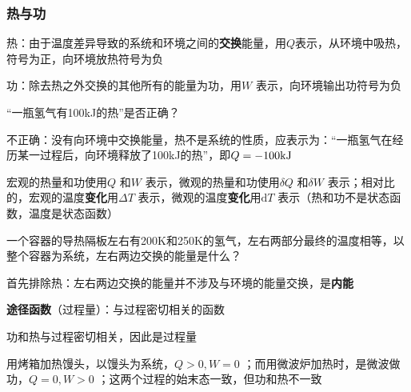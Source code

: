 \subsubsection*{热与功}%
\label{subsub:热与功}
\begin{defi}
热：由于温度差异导致的系统和环境之间的\textbf{交换}能量，用$Q$表示，从环境中吸热，符号为正，向环境放热符号为负

功：除去热之外交换的其他所有的能量为功，用$W$ 表示，向环境输出功符号为负
\end{defi}
\begin{question}
    “一瓶氢气有100kJ的热”是否正确？
\end{question}
\begin{sol}
    不正确：没有向环境中交换能量，热不是系统的性质，应表示为：“一瓶氢气在经历某一过程后，向环境释放了100kJ的热”，即$Q=-100\ce{kJ}$
\end{sol}
宏观的热量和功使用$Q$ 和$W$ 表示，微观的热量和功使用$\delta Q$ 和$\delta W$ 表示；相对比的，宏观的温度\textbf{变化}用$\Delta T$ 表示，微观的温度\textbf{变化}用$\mathrm{d}T$ 表示（热和功不是状态函数，温度是状态函数）
\begin{question}
    一个容器的导热隔板左右有200K和250K的氢气，左右两部分最终的温度相等，以整个容器为系统，左右两边交换的能量是什么？
\end{question}
\begin{sol}
    首先排除热：左右两边交换的能量并不涉及与环境的能量交换，是\textbf{内能}
\end{sol}
\begin{defi}
    \textbf{途径函数}（过程量）：与过程密切相关的函数
\end{defi}
功和热与过程密切相关，因此是过程量
\begin{eg}
    用烤箱加热馒头，以馒头为系统，$Q>0,W=0$ ；而用微波炉加热时，是微波做功，$Q=0,W>0$ ；这两个过程的始末态一致，但功和热不一致
\end{eg}
